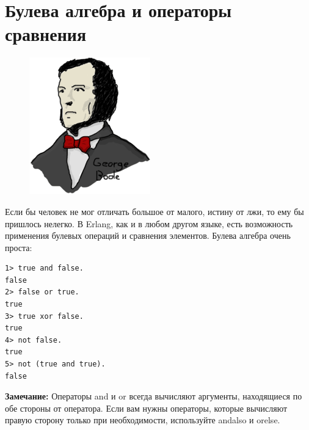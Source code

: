 \documentclass[a4paper,12pt]{report}
\newcommand{\ops}{\colorbox{lgreen}}
\begin{document}
\section{Булева алгебра и операторы сравнения}\label{boolandcompare}
\begin{figure}
    \includegraphics[width=1.0\linewidth]{boole.png}
\end{figure}
Если бы человек не мог отличать большое от малого, истину от лжи, то ему бы пришлось нелегко. В Erlang, как и в любом другом языке, есть возможность применения булевых операций и сравнения элементов.
Булева алгебра очень проста:\\ 
\begin{lstlisting}[style=repl]
1> true and false.
false
2> false or true.
true
3> true xor false.
true
4> not false.
true
5> not (true and true).
false
\end{lstlisting} 
\colorbox{lgray}
{
    \begin{minipage}{1.0\linewidth}
        \textbf{Замечание:} Операторы \ops{and} и \ops{or} всегда вычисляют аргументы, находящиеся по обе стороны от оператора. Если вам нужны операторы, которые вычисляют правую сторону только при необходимости, используйте \ops{andalso} и \ops{orelse}.
    \end{minipage}
} 
\end{document}
